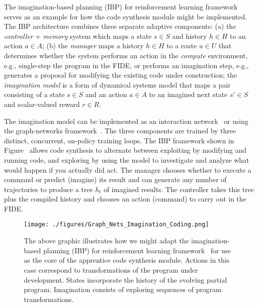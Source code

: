 
The imagination-based planning (IBP) for reinforcement learning framework~\cite{PascanuetalCoRR-17} serves as an example for how the code synthesis module might be implemented. The IBP architecture combines three separate adaptive components: (a) the {\it{controller}} + {\it{memory}} system which maps a state $s \in S$ and history $h \in H$ to an action $a \in A$; (b) the {\it{manager}} maps a history $h \in H$ to a route $u \in U$ that determines whether the system performs an action in the {\it{compute}} environment, e.g., single-step the program in the FIDE, or performs an imagination step, e.g., generates a proposal for modifying the existing code under construction; the {\it{imagination model}} is a form of dynamical systems model that maps a pair consisting of a state $s \in S$ and an action $a \in A$ to an imagined next state $s' \in S$ and scalar-valued reward $r \in R$.

The imagination model can be implemented as an interaction network~\cite{BattagliaetalNIPS-16} or using the graph-networks framework~\cite{BattagliaetalCoRR-18,SanchezetalCoRR-18}. The three components are trained by three distinct, concurrent, on-policy training loops. The IBP framework shown in Figure~{} allows code synthesis to alternate between exploiting by modifying and running code, and exploring by using the model to investigate and analyze what would happen if you actually did act. The manager chooses whether to execute a command or predict (imagine) its result and can generate any number of trajectories to produce a tree $h_t$ of imagined results. The controller takes this tree plus the compiled history and chooses an action (command) to carry out in the FIDE.


\begin{figure}
%
  \begin{center} 
    \texttt{[image: ./figures/Graph\_Nets\_Imagination\_Coding.png]} %
  \end{center}
%
  \caption{The above graphic illustrates how we might adapt the imagination-based planning (IBP) for reinforcement learning framework~\cite{PascanuetalCoRR-17} for use as the core of the apprentice code synthesis module. Actions in this case correspond to transformations of the program under development. States incorporate the history of the evolving partial program. Imagination consists of exploring sequences of program transformations.}
%
  \label{fig_imagine}
%
\end{figure}

